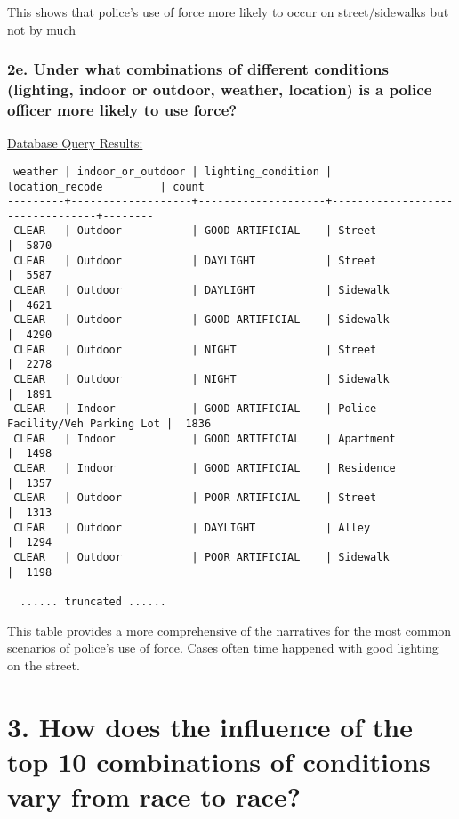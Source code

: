 \documentclass[10pt]{article}
\begin{document}
This shows that police's use of force more likely to occur on street/sidewalks but not by much

\subsubsection*{2e. Under what combinations of different conditions (lighting, indoor or outdoor, weather, location) is a police officer more likely to use force?}

\underline{Database Query Results:}

\begin{verbatim}
 weather | indoor_or_outdoor | lighting_condition |         location_recode         | count
---------+-------------------+--------------------+---------------------------------+--------
 CLEAR   | Outdoor           | GOOD ARTIFICIAL    | Street                          |  5870
 CLEAR   | Outdoor           | DAYLIGHT           | Street                          |  5587
 CLEAR   | Outdoor           | DAYLIGHT           | Sidewalk                        |  4621
 CLEAR   | Outdoor           | GOOD ARTIFICIAL    | Sidewalk                        |  4290
 CLEAR   | Outdoor           | NIGHT              | Street                          |  2278
 CLEAR   | Outdoor           | NIGHT              | Sidewalk                        |  1891
 CLEAR   | Indoor            | GOOD ARTIFICIAL    | Police Facility/Veh Parking Lot |  1836
 CLEAR   | Indoor            | GOOD ARTIFICIAL    | Apartment                       |  1498
 CLEAR   | Indoor            | GOOD ARTIFICIAL    | Residence                       |  1357
 CLEAR   | Outdoor           | POOR ARTIFICIAL    | Street                          |  1313
 CLEAR   | Outdoor           | DAYLIGHT           | Alley                           |  1294
 CLEAR   | Outdoor           | POOR ARTIFICIAL    | Sidewalk                        |  1198

  ...... truncated ......
\end{verbatim}

This table provides a more comprehensive of the narratives for the most common scenarios of police's use of force. Cases often time happened with good lighting on the street.


\section*{3. How does the influence of the top 10 combinations of conditions vary from race to race?}
\end{document}

